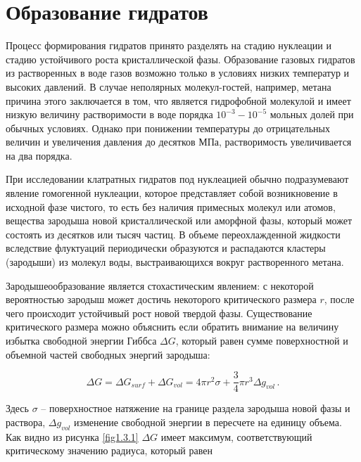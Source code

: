 \pagebreak
\section{Образование гидратов}
\par Процесс формирования гидратов принято разделять на стадию нуклеации и стадию устойчивого роста кристаллической фазы. Образование газовых гидратов из растворенных в воде газов возможно только в условиях низких температур и высоких давлений. В случае неполярных молекул-гостей, например, метана причина этого заключается в том, что  является гидрофобной молекулой и имеет низкую величину растворимости в воде порядка $10^{-3}-10^{-5}$ мольных долей при обычных условиях. Однако при понижении температуры до отрицательных величин и увеличения давления до десятков МПа, растворимость   увеличивается на два порядка.

\par При исследовании клатратных гидратов под нуклеацией обычно подразумевают явление гомогенной нуклеации, которое представляет собой возникновение в исходной фазе чистого, то есть без наличия примесных молекул или атомов, вещества зародыша новой кристаллической или аморфной фазы, который может состоять из десятков или тысяч частиц. В объеме переохлажденной жидкости вследствие флуктуаций периодически образуются и распадаются кластеры (зародыши) из молекул воды, выстраивающихся вокруг растворенного метана.

\par Зародышеообразование является стохастическим явлением: с некоторой вероятностью зародыш может достичь некоторого критического размера $r$, после чего происходит устойчивый рост новой твердой фазы. Существование критического размера можно объяснить если обратить внимание на величину избытка свободной энергии Гиббса $\Delta G$, который равен сумме поверхностной и объемной частей свободных энергий зародыша:

\begin{equation}
\Delta G = \Delta G_{surf} + \Delta G_{vol} = 4\pi r^2 \sigma + \frac{3}{4}\pi r^3 \Delta g_{vol} \, .
\label{eq1.3.1}
\end{equation}

Здесь $\sigma$ -- поверхностное натяжение на границе раздела зародыша новой фазы и раствора, $\Delta g_{vol}$ изменение свободной энергии в пересчете на единицу объема. Как видно из рисунка \ref{fig1.3.1} $\Delta G$ имеет максимум, соответствующий критическому значению радиуса, который равен

